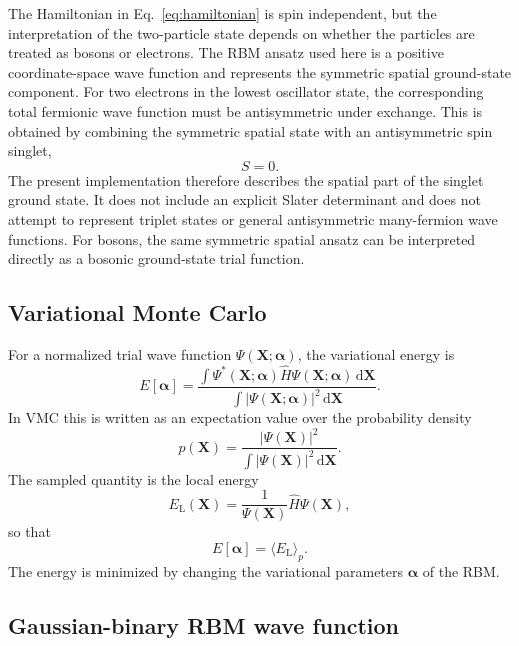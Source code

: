 \documentclass[10pt,a4paper]{article}
\newcommand{\bX}{\mathbf{X}}
\newcommand{\dd}{\mathrm{d}}
\newcommand{\EL}{E_{\mathrm{L}}}
\begin{document}
The Hamiltonian in Eq.~\eqref{eq:hamiltonian} is spin independent, but the interpretation of the two-particle state depends on whether the particles are treated as bosons or electrons. The RBM ansatz used here is a positive coordinate-space wave function and represents the symmetric spatial ground-state component. For two electrons in the lowest oscillator state, the corresponding total fermionic wave function must be antisymmetric under exchange. This is obtained by combining the symmetric spatial state with an antisymmetric spin singlet,
\begin{equation}
S=0.
\end{equation}
The present implementation therefore describes the spatial part of the singlet ground state. It does not include an explicit Slater determinant and does not attempt to represent triplet states or general antisymmetric many-fermion wave functions. For bosons, the same symmetric spatial ansatz can be interpreted directly as a bosonic ground-state trial function.

\subsection{Variational Monte Carlo}

For a normalized trial wave function $\Psi(\bX;\bm{\alpha})$, the variational energy is
\begin{equation}
E[\bm{\alpha}]
=
\frac{\int \Psi^*(\bX;\bm{\alpha})\hat{H}\Psi(\bX;\bm{\alpha})\,\dd \bX}{\int |\Psi(\bX;\bm{\alpha})|^2\,\dd \bX}.
\end{equation}
In VMC this is written as an expectation value over the probability density
\begin{equation}
p(\bX)=\frac{|\Psi(\bX)|^2}{\int |\Psi(\bX)|^2\,\dd\bX}.
\end{equation}
The sampled quantity is the local energy
\begin{equation}
\EL(\bX)=\frac{1}{\Psi(\bX)}\hat{H}\Psi(\bX),
\label{eq:local-energy-def}
\end{equation}
so that
\begin{equation}
E[\bm{\alpha}]=\langle \EL\rangle_p.
\end{equation}
The energy is minimized by changing the variational parameters $\bm{\alpha}$ of the RBM.

\subsection{Gaussian-binary RBM wave function}
\end{document}
